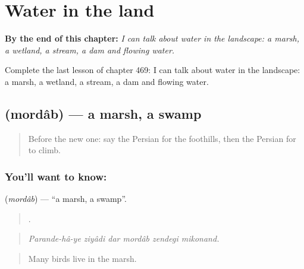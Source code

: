 
\chapter{Water in the land}
\label{ch:fa-water-in-the-land}

\begin{chapteropening}
\textbf{By the end of this chapter:} \emph{I can talk about water in the landscape: a marsh, a wetland, a stream, a dam and flowing water.}

Complete the last lesson of chapter 469: I can talk about water in the landscape: a marsh, a wetland, a stream, a dam and flowing water.
\end{chapteropening}

\section[\texorpdfstring{\fa{مرداب} (mordâb)}{مرداب (mordâb)}]{ (mordâb) — a marsh, a swamp}

\label{lesson:FA-C469-mordab}



\begin{quote}
Before the new one: say the Persian for the foothills, then the Persian for to climb.
\end{quote}

\subsection*{You'll want to know: }
\textbf{} (\emph{mordâb}) — \textquotedblleft{}a marsh, a swamp\textquotedblright{}.

\begin{quote}
      .
\end{quote}

\begin{quote}
\emph{Parande-hâ-ye ziyâdi dar mordâb zendegi mikonand.}
\end{quote}

\begin{quote}
Many birds live in the marsh.
\end{quote}

